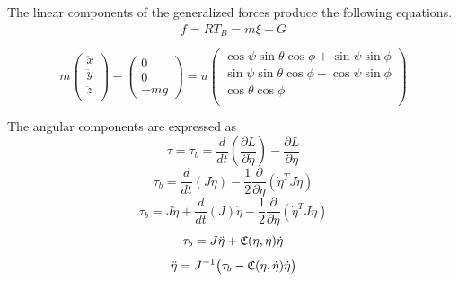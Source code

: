 \noindent The linear components of the generalized forces produce the following equations.
\begin{equation}
    \label{linforce}
    f =  R  T_B = m \ddot{ \xi} -  G
\end{equation}


\begin{equation}
    m\left(\begin{array}{c}
      \ddot{x}\\
      \ddot{y}\\
      \ddot{z}\\
    \end{array}\right)
    - \left( \begin{array}{c}
        0\\
        0\\
        -m g
      \end{array} \right)
      =u
     \left(
    \begin{array}{c}
     \cos{\psi}\sin{\theta}\cos{\phi} + \sin{\psi}\sin{\phi} \\
     \sin{\psi}\sin{\theta}\cos{\phi} - \cos{\psi}\sin{\phi} \\
     \cos{\theta} \cos{\phi} \\
    \end{array}
    \right)
\end{equation}


\noindent The angular components are expressed as
\begin{equation}
    \tau = \tau_b =\frac{d}{dt} \left( \frac{\partial  L} {\partial \dot{\eta}}\right) - \frac{\partial  L}{\partial \eta}
\end{equation}
\begin{equation}
    \tau_b =\frac{d}{dt} ( J \dot{\eta} ) - \frac{1}{2} \frac{\partial}{\partial \eta} ( \dot{\eta}^T J \dot{\eta}  )
\end{equation}
\begin{equation}
    \tau_b =J \ddot{\eta} + \frac{d}{dt}(J) \dot{\eta} - \frac{1}{2} \frac{\partial}{\partial \eta} ( \dot{\eta}^T J \dot{\eta}  )
\end{equation}
\begin{equation}
    \tau_b =  J \ddot{\eta} + \mathfrak{C}(\eta,\dot{\eta}) \dot{\eta}
\end{equation}
\begin{equation}
    \label{eq:angularacc}
    \ddot{\eta} = J^{-1} \big( \tau_b - \cc(\eta,\dot{\eta}) \dot{\eta} \big)
\end{equation}

